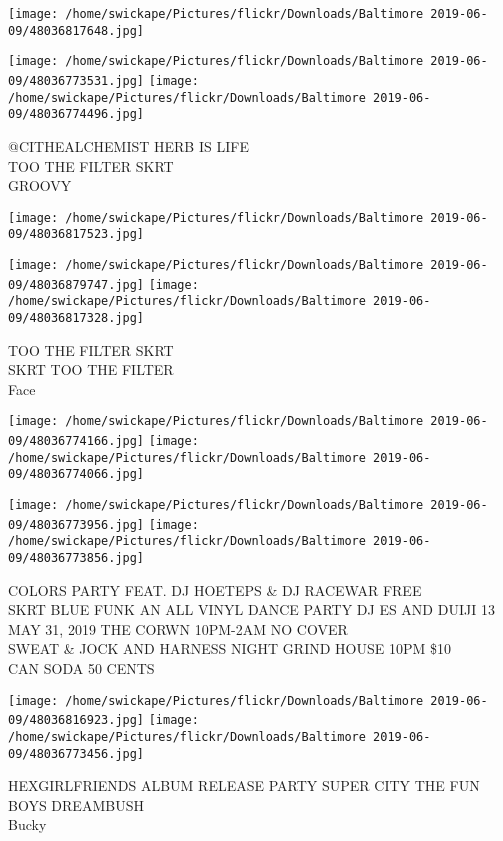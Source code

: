 \documentclass[10pt,letterpaper]{article}
\begin{document}
\texttt{[image: /home/swickape/Pictures/flickr/Downloads/Baltimore 2019-06-09/48036817648.jpg]}

\vspace{0.25in}
\texttt{[image: /home/swickape/Pictures/flickr/Downloads/Baltimore 2019-06-09/48036773531.jpg]}
\texttt{[image: /home/swickape/Pictures/flickr/Downloads/Baltimore 2019-06-09/48036774496.jpg]}

@CITHEALCHEMIST HERB IS LIFE\\
TOO THE FILTER SKRT\\
GROOVY
\pagebreak

\texttt{[image: /home/swickape/Pictures/flickr/Downloads/Baltimore 2019-06-09/48036817523.jpg]}

\vspace{0.25in}
\texttt{[image: /home/swickape/Pictures/flickr/Downloads/Baltimore 2019-06-09/48036879747.jpg]}
\texttt{[image: /home/swickape/Pictures/flickr/Downloads/Baltimore 2019-06-09/48036817328.jpg]}

TOO THE FILTER SKRT\\
SKRT TOO THE FILTER\\
Face
\pagebreak

\texttt{[image: /home/swickape/Pictures/flickr/Downloads/Baltimore 2019-06-09/48036774166.jpg]}
\texttt{[image: /home/swickape/Pictures/flickr/Downloads/Baltimore 2019-06-09/48036774066.jpg]}

\texttt{[image: /home/swickape/Pictures/flickr/Downloads/Baltimore 2019-06-09/48036773956.jpg]}
\texttt{[image: /home/swickape/Pictures/flickr/Downloads/Baltimore 2019-06-09/48036773856.jpg]}

COLORS PARTY FEAT. DJ HOETEPS \& DJ RACEWAR FREE\\
SKRT BLUE FUNK AN ALL VINYL DANCE PARTY DJ ES AND DUIJI 13 MAY 31, 2019 THE CORWN 10PM{-}2AM NO COVER\\
SWEAT \& JOCK AND HARNESS NIGHT GRIND HOUSE 10PM \$10\\
CAN SODA 50 CENTS
\pagebreak

\texttt{[image: /home/swickape/Pictures/flickr/Downloads/Baltimore 2019-06-09/48036816923.jpg]}
\texttt{[image: /home/swickape/Pictures/flickr/Downloads/Baltimore 2019-06-09/48036773456.jpg]}

HEXGIRLFRIENDS ALBUM RELEASE PARTY SUPER CITY THE FUN BOYS DREAMBUSH\\
Bucky
\pagebreak
\end{document}
